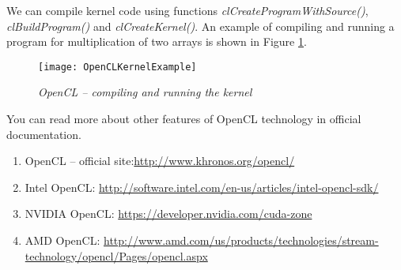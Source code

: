 {\begin{itemize}
		\end{itemize}
	\par We can compile kernel code using functions \textit{clCreateProgramWithSource()}, \textit{clBuildProgram()} and \textit{clCreateKernel()}. An example of compiling and running a program for multiplication of two arrays is shown in Figure \ref{OpenCLKernelExample:image}.
	\begin{figure}[H]
		\texttt{[image: OpenCLKernelExample]}
		\caption{\textit{OpenCL – compiling and running the kernel}}
		\label{OpenCLKernelExample:image}
	\end{figure}
	\sloppy You can read more about other features of OpenCL technology %
	in official documentation.
	\begin{enumerate}
		\sloppy
		\item OpenCL – official site:\url{http://www.khronos.org/opencl/}
		\item Intel OpenCL: \url{http://software.intel.com/en-us/articles/intel-opencl-sdk/}
		\item NVIDIA OpenCL: \url{https://developer.nvidia.com/cuda-zone}
		\item AMD OpenCL: \url{http://www.amd.com/us/products/technologies/stream-technology/opencl/Pages/opencl.aspx}
	\end{enumerate}
}